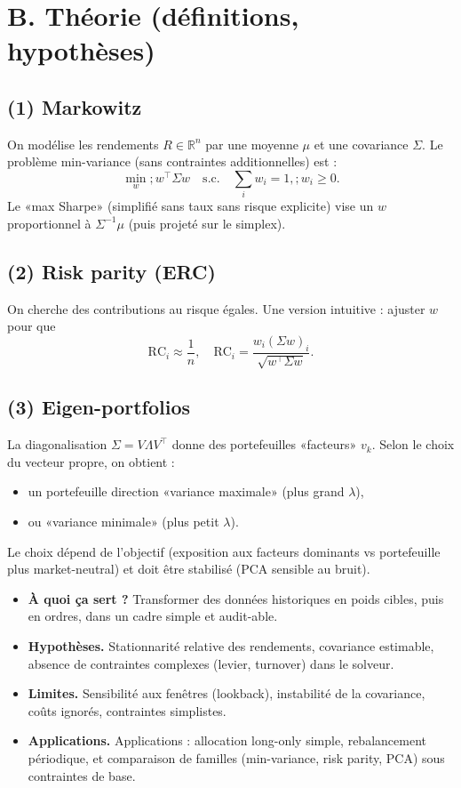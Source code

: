\documentclass[11pt,a4paper]{report}
\theoremstyle{definition}
\theoremstyle{plain}
\theoremstyle{remark}
\newcommand{\1}{\mathbf{1}}
\newcommand{\R}{\mathbb{R}}
\newcommand{\qa}[4]{
\begin{itemize}[leftmargin=*]
\item \textbf{À quoi ça sert ?} #1
\item \textbf{Hypothèses.} #2
\item \textbf{Limites.} #3
\item \textbf{Applications.} #4
\end{itemize}
}
\begin{document}
\section{B. Théorie (définitions, hypothèses)}
\subsection*{(1) Markowitz}
On modélise les rendements $R\in\R^n$ par une moyenne $\mu$ et une covariance $\Sigma$. Le problème min-variance (sans contraintes additionnelles) est :
\[
\min_{w}; w^\top \Sigma w \quad\text{s.c.}\quad \sum_i w_i=1,; w_i\ge 0.
\]
Le «max Sharpe» (simplifié sans taux sans risque explicite) vise un $w$ proportionnel à $\Sigma^{-1}\mu$ (puis projeté sur le simplex).

\subsection*{(2) Risk parity (ERC)}
On cherche des contributions au risque égales. Une version intuitive : ajuster $w$ pour que
\[
\text{RC}_i \approx \frac{1}{n},\quad
\text{RC}_i=\frac{w_i(\Sigma w)_i}{\sqrt{w^\top \Sigma w}}.
\]

\subsection*{(3) Eigen-portfolios}
La diagonalisation $\Sigma = V\Lambda V^\top$ donne des portefeuilles «facteurs» $v_k$. Selon le choix du vecteur propre, on obtient :
\begin{itemize}[leftmargin=*]
\item un portefeuille direction «variance maximale» (plus grand $\lambda$),
\item ou «variance minimale» (plus petit $\lambda$).
\end{itemize}
Le choix dépend de l'objectif (exposition aux facteurs dominants vs portefeuille plus market-neutral) et doit être stabilisé (PCA sensible au bruit).

\qa
{Transformer des données historiques en poids cibles, puis en ordres, dans un cadre simple et audit-able.}
{Stationnarité relative des rendements, covariance estimable, absence de contraintes complexes (levier, turnover) dans le solveur.}
{Sensibilité aux fenêtres (lookback), instabilité de la covariance, coûts ignorés, contraintes simplistes.}
{Applications : allocation long-only simple, rebalancement périodique, et comparaison de familles (min-variance, risk parity, PCA) sous contraintes de base.}
\end{document}
